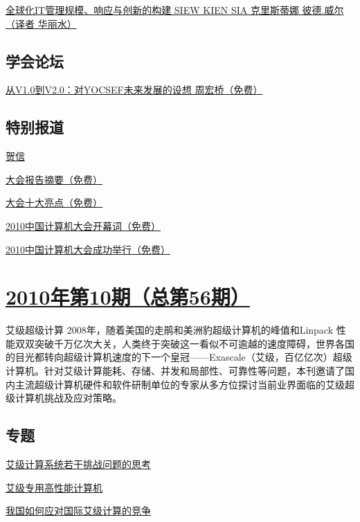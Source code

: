 \documentclass[a4paper]{article}
\begin{document}
\href{http://history.ccf.org.cn/resources/1190201776262/2010/11/17/20.pdf}{全球化IT管理规模、响应与创新的构建  SIEW KIEN SIA 克里斯蒂娜 彼德.威尔（译者 华丽水）}

\subsection{学会论坛}
\href{http://history.ccf.org.cn/resources/1190201776262/2010/11/17/22.pdf}{从V1.0到V2.0：对YOCSEF未来发展的设想  周宏桥（免费）}

\subsection{特别报道}
\href{http://history.ccf.org.cn/resources/1190201776262/2010/11/17/3.pdf}{贺信}

\href{http://history.ccf.org.cn/resources/1190201776262/2010/11/17/4.pdf}{大会报告摘要（免费）}

\href{http://history.ccf.org.cn/resources/1190201776262/2010/11/17/5.pdf}{大会十大亮点（免费）}

\href{http://history.ccf.org.cn/resources/1190201776262/2010/11/15/3.pdf}{2010中国计算机大会开幕词（免费）}

\href{http://history.ccf.org.cn/resources/1190201776262/2010/11/15/1.pdf}{2010中国计算机大会成功举行（免费）}


\section{\href{http://history.ccf.org.cn/sites/ccf/jsjtbbd.jsp?contentId=2573051627543}{\textbf{2010年第10期（总第56期）}}}
艾级超级计算 2008年，随着美国的走鹃和美洲豹超级计算机的峰值和Linpack 性能双双突破千万亿次大关，人类终于突破这一看似不可逾越的速度障碍，世界各国的目光都转向超级计算机速度的下一个皇冠——Exascale（艾级，百亿亿次）超级计算机。针对艾级计算能耗、存储、并发和局部性、可靠性等问题，本刊邀请了国内主流超级计算机硬件和软件研制单位的专家从多方位探讨当前业界面临的艾级超级计算机挑战及应对策略。
\subsection{专题}
\href{http://history.ccf.org.cn/resources/1190201776262/2010/10/20/zhuanlan-4.pdf}{艾级计算系统若干挑战问题的思考}

\href{http://history.ccf.org.cn/resources/1190201776262/2010/10/20/zhuanti-6.pdf}{艾级专用高性能计算机}

\href{http://history.ccf.org.cn/resources/1190201776262/2010/10/20/zhuanti-3.pdf}{我国如何应对国际艾级计算的竞争}
\end{document}
